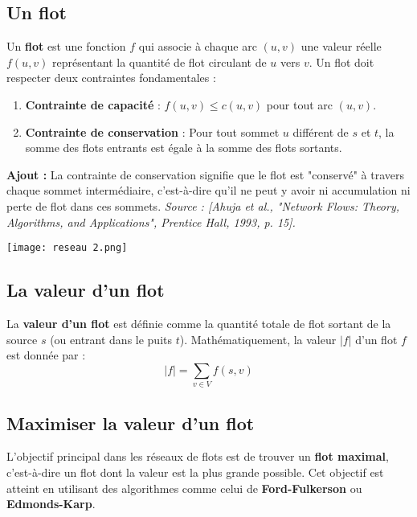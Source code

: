 \documentclass[10pt,a4paper]{article}
\begin{document}
\subsection*{Un flot}

Un \textbf{flot} est une fonction \( f \) qui associe à chaque arc \( (u, v) \) une valeur réelle \( f(u, v) \) représentant la quantité de flot circulant de \( u \) vers \( v \). Un flot doit respecter deux contraintes fondamentales :
\begin{enumerate}
    \item \textbf{Contrainte de capacité} : \( f(u, v) \leq c(u, v) \) pour tout arc \( (u, v) \).
    \item \textbf{Contrainte de conservation} : Pour tout sommet \( u \) différent de \( s \) et \( t \), la somme des flots entrants est égale à la somme des flots sortants.
\end{enumerate}

\textbf{Ajout :} La contrainte de conservation signifie que le flot est "conservé" à travers chaque sommet intermédiaire, c'est-à-dire qu'il ne peut y avoir ni accumulation ni perte de flot dans ces sommets. \textit{Source : [Ahuja et al., "Network Flows: Theory, Algorithms, and Applications", Prentice Hall, 1993, p. 15].}

\texttt{[image: reseau 2.png]}

\subsection*{La valeur d'un flot}

La \textbf{valeur d'un flot} est définie comme la quantité totale de flot sortant de la source \( s \) (ou entrant dans le puits \( t \)). Mathématiquement, la valeur \( |f| \) d'un flot \( f \) est donnée par :
\[ |f| = \sum_{v \in V} f(s, v) \]


\subsection*{Maximiser la valeur d'un flot}

L'objectif principal dans les réseaux de flots est de trouver un \textbf{flot maximal}, c'est-à-dire un flot dont la valeur est la plus grande possible. Cet objectif est atteint en utilisant des algorithmes comme celui de \textbf{Ford-Fulkerson} ou \textbf{Edmonds-Karp}.
\end{document}

